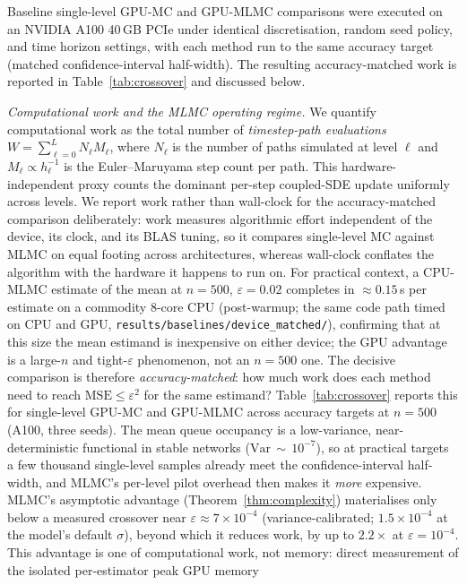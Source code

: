 \documentclass{ieeeaccess}
\begin{document}
Baseline single-level GPU-MC and GPU-MLMC comparisons were executed on an NVIDIA A100 40\,GB PCIe
under identical discretisation, random seed policy, and time horizon settings, with each method
run to the same accuracy target (matched confidence-interval half-width). The resulting
accuracy-matched work is reported in Table~\ref{tab:crossover} and discussed below.

\textit{Computational work and the MLMC operating regime.}
We quantify computational work as the total number of \emph{timestep-path evaluations}
$W=\sum_{\ell=0}^{L} N_\ell M_\ell$, where $N_\ell$ is the number of paths simulated at level
$\ell$ and $M_\ell\propto h_\ell^{-1}$ is the Euler--Maruyama step count per path. This
hardware-independent proxy counts the dominant per-step coupled-SDE update uniformly across
levels. We report work rather than wall-clock for the accuracy-matched comparison deliberately:
work measures algorithmic effort independent of the device, its clock, and its BLAS tuning, so
it compares single-level MC against MLMC on equal footing across architectures, whereas
wall-clock conflates the algorithm with the hardware it happens to run on. For practical
context, a CPU-MLMC estimate of the mean at $n{=}500$, $\varepsilon{=}0.02$ completes in
${\approx}0.15$\,s per estimate on a commodity 8-core CPU (post-warmup; the same code path timed
on CPU and GPU, \texttt{results/baselines/device\_matched/}), confirming that at this size the
mean estimand is inexpensive on either device; the GPU advantage is a large-$n$ and tight-$\varepsilon$
phenomenon, not an $n{=}500$ one. The decisive comparison is therefore \emph{accuracy-matched}:
how much work does each method need to reach $\mathrm{MSE}\leq\varepsilon^2$ for the same estimand? Table~\ref{tab:crossover} reports
this for single-level GPU-MC and GPU-MLMC across accuracy targets at $n{=}500$ (A100, three
seeds). The mean queue occupancy is a low-variance, near-deterministic functional in stable
networks ($\mathrm{Var}\,{\sim}\,10^{-7}$), so at practical targets a few thousand single-level
samples already meet the confidence-interval half-width, and MLMC's per-level pilot overhead
then makes it \emph{more} expensive. MLMC's asymptotic advantage (Theorem~\ref{thm:complexity})
materialises only below a measured crossover near $\varepsilon\approx7\times10^{-4}$ (variance-calibrated; $1.5\times10^{-4}$ at the model's default $\sigma$), beyond
which it reduces work, by up to $2.2\times$ at $\varepsilon{=}10^{-4}$. This advantage is one of
computational work, not memory: direct measurement of the isolated per-estimator peak GPU memory
\end{document}
